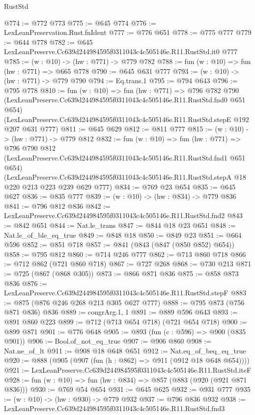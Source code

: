 \begin{lexlean}{RustStd}
\begin{coremodule}
@774 := @772 @773
@775 := @645 @774
@776 := LexLeanPreservation.Rust.fnIdent
@777 := @776 @651
@778 := @775 @777
@779 := @644 @778
@782 := @645 LexLeanPreserve.Cc639d244984595f0311043c4c505146e.R11.RustStd.it0 @777
@785 := (w : @10) -> (hw : @771) -> @779 @782
@788 := fun (w : @10) => fun (hw : @771) => @665 @778
@790 := @645 @631 @777
@793 := (w : @10) -> (hw : @771) -> @779 @790
@794 := Eq.trans.{1}
@795 := @794 @643
@796 := @795 @778
@810 := fun (w : @10) =>
  fun (hw : @771) =>
  @796
    @782
    @790
    (LexLeanPreserve.Cc639d244984595f0311043c4c505146e.R11.RustStd.fnd0 @651 @654)
    (LexLeanPreserve.Cc639d244984595f0311043c4c505146e.R11.RustStd.stepE @192 @207 @631 @777)
@811 := @645 @629
@812 := @811 @777
@815 := (w : @10) -> (hw : @771) -> @779 @812
@832 := fun (w : @10) =>
  fun (hw : @771) =>
  @796
    @790
    @812
    (LexLeanPreserve.Cc639d244984595f0311043c4c505146e.R11.RustStd.fnd1 @651 @654)
    (LexLeanPreserve.Cc639d244984595f0311043c4c505146e.R11.RustStd.stepA
      @18
      @220
      @213
      @223
      @239
      @629
      @777)
@834 := @769 @23 @654
@835 := @645 @627
@836 := @835 @777
@839 := (w : @10) -> (hw : @834) -> @779 @836
@841 := @796 @812 @836
@842 := LexLeanPreserve.Cc639d244984595f0311043c4c505146e.R11.RustStd.fnd2
@843 := @842 @651
@844 := Nat.le_trans
@847 := @844 @18 @23 @651
@848 := Nat.le_of_ble_eq_true
@849 := @848 @18
@850 := @849 @23
@851 := @664 @596
@852 := @851 @718
@857 := @841 (@843 (@847 (@850 @852) @654))
@858 := @795 @812
@860 := @714 @246 @777
@862 := @713 @860 @718
@866 := @712 @862 (@721 @860 @718)
@867 := @727 @268
@868 := @730 @213
@871 := @725 (@867 (@868 @305))
@873 := @866 @871 @836
@875 := @858 @873 @836
@876 := LexLeanPreserve.Cc639d244984595f0311043c4c505146e.R11.RustStd.stepF
@883 := @875 (@876 @246 @268 @213 @305 @627 @777)
@888 := @795 @873 (@756 @871 @836) @836
@889 := congrArg.{1, 1}
@891 := @889 @596 @643
@893 := @891 @860 @223
@899 := @712 (@713 @654 @718) (@721 @654 @718)
@900 := @899 @871
@901 := @776 @648
@905 := @893 (fun (c : @596) => @900 (@835 @901))
@906 := Bool.of_not_eq_true
@907 := @906 @860
@908 := Nat.ne_of_lt
@911 := @908 @18 @648 @651
@912 := Nat.eq_of_beq_eq_true
@920 := @888 (@905 (@907 (fun (h : @862) => @911 (@912 @18 @648 @654))))
@921 := LexLeanPreserve.Cc639d244984595f0311043c4c505146e.R11.RustStd.iteF
@928 := fun (w : @10) => fun (hw : @834) => @857 (@883 (@920 (@921 @871 @836)))
@930 := @769 @54 @654
@931 := @645 @625
@932 := @931 @777
@935 := (w : @10) -> (hw : @930) -> @779 @932
@937 := @796 @836 @932
@938 := LexLeanPreserve.Cc639d244984595f0311043c4c505146e.R11.RustStd.fnd3

\end{coremodule}
\end{lexlean}
